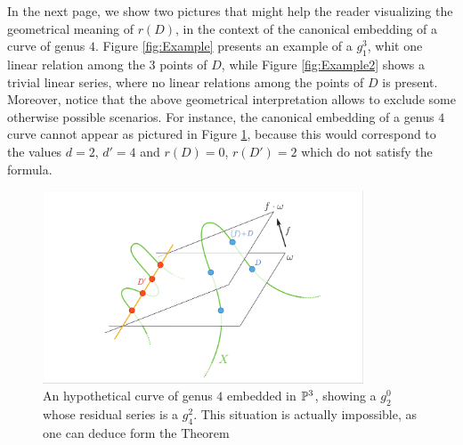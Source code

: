 	In the next page, we show two pictures that might help the reader visualizing the geometrical meaning of $r(D)$, in the context of the canonical embedding of a curve of genus $4$. Figure \ref{fig:Example} presents an example of a $g_1^3$, whit one linear relation among the $3$ points of $D$, while Figure \ref{fig:Example2} shows a trivial linear series, where no linear relations among the points of $D$ is present.\\

	Moreover, notice that the above geometrical interpretation allows to exclude some otherwise possible scenarios. For instance, the canonical embedding of a genus $4$ curve cannot appear as pictured in Figure \ref{fig:Impossible}, because this would correspond to the values $d=2$, $d'=4$ and $r(D)=0$, $r(D')=2$ which do not satisfy the \RR formula.
	\vspace{1.5em}
	\begin{figure}[H]
		\centering
		\includegraphics[width=0.85\textwidth]{Impossible.pdf}
		\caption{An hypothetical curve of genus $4$ embedded in $\mathbb{P}^3$, showing a $g_2^0$ whose residual series is a $g_4^2$. This situation is actually impossible, as one can deduce form the \RR Theorem }
		\label{fig:Impossible}
	\end{figure}



